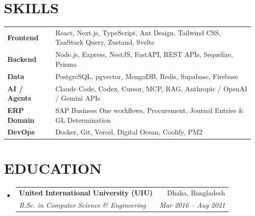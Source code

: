 \documentclass[letterpaper,12pt]{article}
\makeatletter
\newcommand{\resumeSubheading}[4]{
  \Needspace{4\baselineskip}\vspace{-1pt}\item
    \begin{tabular*}{0.97\textwidth}[t]{l@{\extracolsep{\fill}}r}
      \textbf{#1} & \small #2 \\
      \small\textit{#3} & \small\textit{#4} \\
    \end{tabular*}\vspace{-5pt}
}
\newcommand{\resumeSubHeadingListStart}{\begin{itemize}[leftmargin=*]}
\newcommand{\resumeSubHeadingListEnd}{\end{itemize}}
\makeatother
\begin{document}
\section{SKILLS}
\vspace{4pt}
\begin{tabular*}{\textwidth}{@{}l@{\hskip 0.3in}l@{}}
  \textbf{Frontend}     & React, Next.js, TypeScript, Ant Design, Tailwind CSS, TanStack Query, Zustand, Svelte \\[3pt]
  \textbf{Backend}      & Node.js, Express, NestJS, FastAPI, REST APIs, Sequelize, Prisma \\[3pt]
  \textbf{Data}         & PostgreSQL, pgvector, MongoDB, Redis, Supabase, Firebase \\[3pt]
  \textbf{AI / Agents}  & Claude Code, Codex, Cursor, MCP, RAG, Anthropic / OpenAI / Gemini APIs \\[3pt]
  \textbf{ERP Domain}   & SAP Business One workflows, Procurement, Journal Entries \& GL Determination \\[3pt]
  \textbf{DevOps}       & Docker, Git, Vercel, Digital Ocean, Coolify, PM2 \\
\end{tabular*}
\vspace{4pt}

\section{EDUCATION}
  \resumeSubHeadingListStart
    \resumeSubheading
      {United International University (UIU)}{Dhaka, Bangladesh}
      {B.Sc. in Computer Science \& Engineering}{Mar 2016 -- Aug 2021}
  \resumeSubHeadingListEnd

\end{document}

